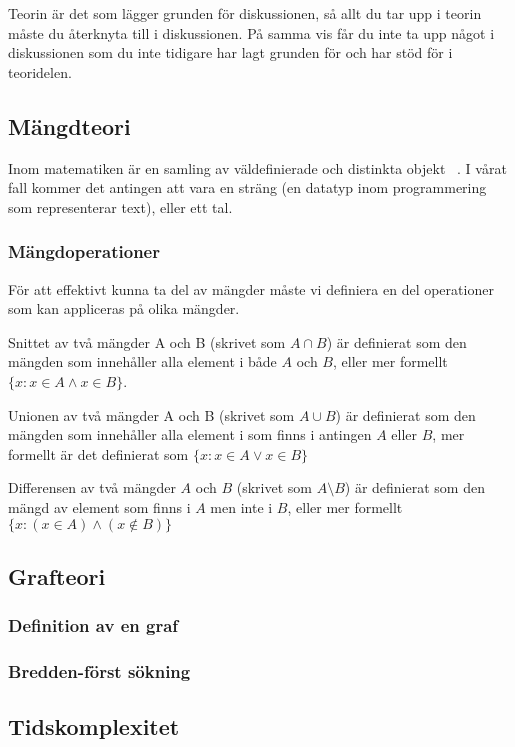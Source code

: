 \documentclass{article}
\begin{document}
Teorin är det som lägger grunden för diskussionen, så allt du tar upp i teorin måste du återknyta till i diskussionen. På samma vis får du inte ta upp något i diskussionen som du inte tidigare har lagt grunden för och har stöd för i teoridelen.

\subsection{Mängdteori}
Inom matematiken är en samling av väldefinierade och distinkta objekt ~\cite{wiki:set}. I vårat fall kommer det antingen att vara en sträng (en datatyp inom programmering som representerar text), eller ett tal.

\subsubsection{Mängdoperationer}
För att effektivt kunna ta del av mängder måste vi definiera en del operationer som kan appliceras på olika mängder. 

Snittet av två mängder A och B (skrivet som $A \cap B$) är definierat som den mängden som innehåller alla element i både $A$ och $B$, eller mer formellt $\{x : x \in A \land x \in B\}$. 

Unionen av två mängder A och B (skrivet som $A \cup B$) är definierat som den mängden som innehåller alla element i som finns i antingen $A$ eller $B$, mer formellt är det definierat som $\{x : x \in A \lor x \in B\}$

Differensen av två mängder $A$ och $B$ (skrivet som $A \setminus B$) är definierat som den mängd av element som finns i $A$ men inte i $B$, eller mer formellt $\{x : (x \in A) \land (x \notin B) \}$


\subsection{Grafteori}


\subsubsection{Definition av en graf}


\subsubsection{Bredden-först sökning}


\subsection{Tidskomplexitet}
\end{document}
